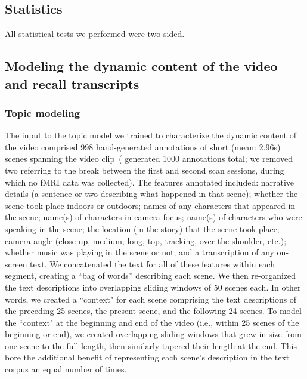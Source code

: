 \documentclass{article}
\begin{document}
\subsection*{Statistics}
All statistical tests we performed were two-sided.

\subsection*{Modeling the dynamic content of the video and recall transcripts}
\subsubsection*{Topic modeling}
The input to the topic model we trained to characterize the dynamic content of the video comprised 998 hand-generated annotations of short (mean: 2.96s) scenes spanning the video clip~(\citealp{ChenEtal17} generated 1000 annotations total; we removed two referring to the break between the first and second scan sessions, during which no fMRI data was collected).  The features annotated included: narrative details (a sentence or two describing what happened in that scene); whether the scene took place indoors or outdoors; names of any characters that appeared in the scene; name(s) of characters in camera focus; name(s) of characters who were speaking in the scene; the location (in the story) that the scene took place; camera angle (close up, medium, long, top, tracking, over the shoulder, etc.); whether music was playing in the scene or not; and a transcription of any on-screen text.  We concatenated the text for all of these features within each segment, creating a ``bag of words'' describing each scene.  We then re-organized the text descriptions into overlapping sliding windows of 50 scenes each.  In other words, we created a ``context" for each scene comprising the text descriptions of the preceding 25 scenes, the present scene, and the following 24 scenes.  To model the ``context" at the beginning and end of the video (i.e., within 25 scenes of the beginning or end), we created overlapping sliding windows that grew in size from one scene to the full length, then similarly tapered their length at the end.  This bore the additional benefit of representing each scene's description in the text corpus an equal number of times.
\end{document}

